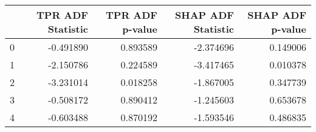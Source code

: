 \begin{tabular}{lrrrr}
\toprule
 & TPR ADF Statistic & TPR ADF p-value & SHAP ADF Statistic & SHAP ADF p-value \\
\midrule
0 & -0.491890 & 0.893589 & -2.374696 & 0.149006 \\
1 & -2.150786 & 0.224589 & -3.417465 & 0.010378 \\
2 & -3.231014 & 0.018258 & -1.867005 & 0.347739 \\
3 & -0.508172 & 0.890412 & -1.245603 & 0.653678 \\
4 & -0.603488 & 0.870192 & -1.593546 & 0.486835 \\
\bottomrule
\end{tabular}
